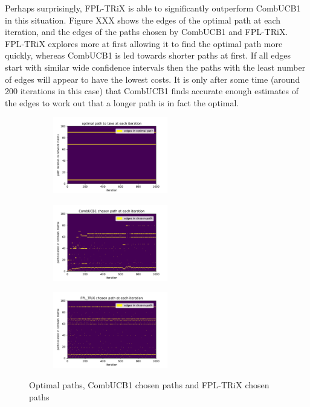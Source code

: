 Perhaps surprisingly, FPL-TRiX is able to significantly outperform CombUCB1 in this situation. Figure XXX shows the edges of the optimal path at each iteration, and the edges of the paths chosen by CombUCB1 and FPL-TRiX. FPL-TRiX explores more at first allowing it to find the optimal path more quickly, whereas CombUCB1 is led towards shorter paths at first. If all edges start with similar wide confidence intervals then the paths with the least number of edges will appear to have the lowest costs. It is only after some time (around 200 iterations in this case) that CombUCB1 finds accurate enough estimates of the edges to work out that a longer path is in fact the optimal.\\

\begin{figure}[h!]
\centering
\begin{subfigure}{.33\textwidth}
  \centering
  \includegraphics[width=50mm]{../plots/stoch_network_opt_paths.pdf}
\end{subfigure}%
\begin{subfigure}{.33\textwidth}
  \centering
  \includegraphics[width=50mm]{../plots/stoch_network_UCB1.pdf}
\end{subfigure}
\begin{subfigure}{.33\textwidth}
  \centering
  \includegraphics[width=50mm]{../plots/stoch_network_FPL.pdf}
\end{subfigure}
\caption{Optimal paths, CombUCB1 chosen paths and FPL-TRiX chosen paths}
\label{fig:ullm-particle}
\end{figure}


